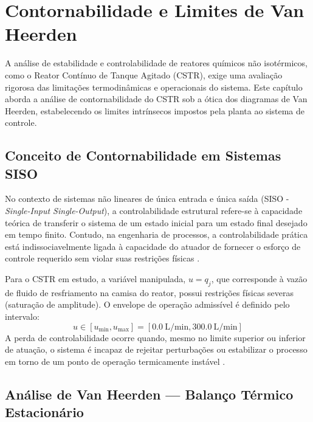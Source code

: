\chapter{Contornabilidade e Limites de Van Heerden}
\label{cap:contornabilidade}

A análise de estabilidade e controlabilidade de reatores químicos não isotérmicos, como o Reator Contínuo de Tanque Agitado (CSTR), exige uma avaliação rigorosa das limitações termodinâmicas e operacionais do sistema. Este capítulo aborda a análise de contornabilidade do CSTR sob a ótica dos diagramas de Van Heerden, estabelecendo os limites intrínsecos impostos pela planta ao sistema de controle.

\section{Conceito de Contornabilidade em Sistemas SISO}
\label{sec:contornabilidade_siso}

No contexto de sistemas não lineares de única entrada e única saída (SISO - \textit{Single-Input Single-Output}), a controlabilidade estrutural refere-se à capacidade teórica de transferir o sistema de um estado inicial para um estado final desejado em tempo finito. Contudo, na engenharia de processos, a controlabilidade prática está indissociavelmente ligada à capacidade do atuador de fornecer o esforço de controle requerido sem violar suas restrições físicas \cite{Seborg2016}.

Para o CSTR em estudo, a variável manipulada, $u = q_j$, que corresponde à vazão de fluido de resfriamento na camisa do reator, possui restrições físicas severas (saturação de amplitude). O envelope de operação admissível é definido pelo intervalo:
\begin{equation}
    u \in [u_{\min}, u_{\max}] = [\SI{0.0}{\liter\per\minute}, \SI{300.0}{\liter\per\minute}]
\end{equation}
A perda de controlabilidade ocorre quando, mesmo no limite superior ou inferior de atuação, o sistema é incapaz de rejeitar perturbações ou estabilizar o processo em torno de um ponto de operação termicamente instável \cite{Bequette2003}.

\section{Análise de Van Heerden — Balanço Térmico Estacionário}
\label{sec:van_heerden}

